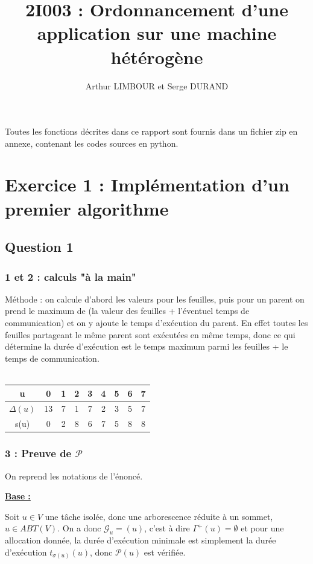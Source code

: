 \documentclass{article}
\title{2I003 : Ordonnancement d'une application sur une machine hétérogène}
\author{Arthur LIMBOUR et Serge DURAND}
\begin{document}
\maketitle
Toutes les fonctions décrites dans ce rapport sont fournis dans un fichier zip en annexe, contenant les codes sources en python.
\section{Exercice 1 : Implémentation d'un premier algorithme}

\subsection{Question 1}
\subsubsection{1 et 2 : calculs "à la main"}
Méthode : on calcule d'abord les valeurs pour les feuilles, puis pour un parent on prend le maximum de (la valeur des feuilles + l'éventuel temps de communication) et on y ajoute le temps d'exécution du parent. En effet toutes les feuilles partageant le même parent sont exécutées en même temps, donc ce qui détermine la durée d'exécution est le temps maximum parmi les feuilles + le temps de communication.\\ \\
\begin{tabular}{|c|c|c|c|c|c|c|c|c|}
  \hline
  u & 0 & 1 & 2 & 3 & 4 & 5 & 6 & 7 \\
  \hline
  $\Delta(u)$ & 13 & 7 & 1 & 7 & 2 & 3 & 5 & 7 \\
  \hline
  s(u) & 0 & 2 & 8 & 6 & 7 & 5 & 8 & 8\\
  \hline
\end{tabular}
\subsubsection{3 : Preuve de $\mathcal{P}$}
On reprend les notations de l'énoncé.
\begin{flushleft}
    \bf
    \underline{Base :}
\end{flushleft}

Soit $u \in V$ une tâche isolée, donc une arborescence réduite à un sommet, $u \in ABT(V)$. On a donc $\mathcal{G}_u = (u)$, c'est à dire $\Gamma^{+}(u) = \emptyset$ et pour une allocation donnée, la durée d'exécution minimale est simplement la durée d'exécution $t_{\sigma(u)}(u)$, donc $\mathcal{P}(u)$ est vérifiée.
\end{document}
